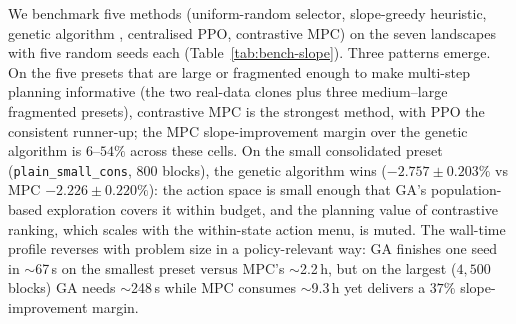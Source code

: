 \documentclass[11pt]{article}
\begin{document}
We benchmark five methods (uniform-random selector, slope-greedy heuristic, genetic algorithm \citep{cao2012boundary}, centralised PPO, contrastive MPC) on the seven landscapes with five random seeds each (Table~\ref{tab:bench-slope}). Three patterns emerge. On the five presets that are large or fragmented enough to make multi-step planning informative (the two real-data clones plus three medium--large fragmented presets), contrastive MPC is the strongest method, with PPO the consistent runner-up; the MPC slope-improvement margin over the genetic algorithm is $6$--$54\%$ across these cells. On the small consolidated preset (\texttt{plain\_small\_cons}, $800$ blocks), the genetic algorithm wins ($-2.757 \pm 0.203\%$ vs MPC $-2.226 \pm 0.220\%$): the action space is small enough that GA's population-based exploration covers it within budget, and the planning value of contrastive ranking, which scales with the within-state action menu, is muted. The wall-time profile reverses with problem size in a policy-relevant way: GA finishes one seed in $\sim$67\,s on the smallest preset versus MPC's $\sim$2.2\,h, but on the largest ($4{,}500$ blocks) GA needs $\sim$248\,s while MPC consumes $\sim$9.3\,h yet delivers a $37\%$ slope-improvement margin.
\end{document}
